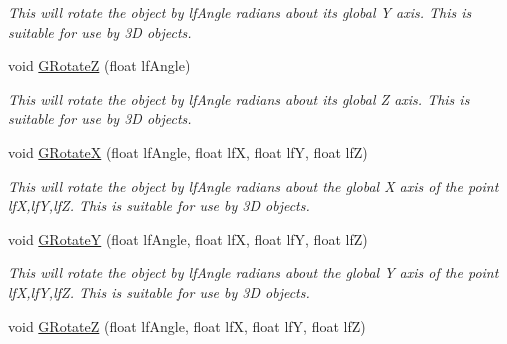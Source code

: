 \begin{DoxyCompactItemize}
\begin{DoxyCompactList}\small\item\em This will rotate the object by lfAngle radians about its global Y axis. This is suitable for use by 3D objects. \end{DoxyCompactList}\item 
\hypertarget{classc_camera_matrix4_a993d7410719b1fd7d871f728527a3947}{
void \hyperlink{classc_camera_matrix4_a993d7410719b1fd7d871f728527a3947}{GRotateZ} (float lfAngle)}
\label{classc_camera_matrix4_a993d7410719b1fd7d871f728527a3947}

\begin{DoxyCompactList}\small\item\em This will rotate the object by lfAngle radians about its global Z axis. This is suitable for use by 3D objects. \end{DoxyCompactList}\item 
\hypertarget{classc_camera_matrix4_a2fc16f6a7aa3ffec1317f71645aa857b}{
void \hyperlink{classc_camera_matrix4_a2fc16f6a7aa3ffec1317f71645aa857b}{GRotateX} (float lfAngle, float lfX, float lfY, float lfZ)}
\label{classc_camera_matrix4_a2fc16f6a7aa3ffec1317f71645aa857b}

\begin{DoxyCompactList}\small\item\em This will rotate the object by lfAngle radians about the global X axis of the point lfX,lfY,lfZ. This is suitable for use by 3D objects. \end{DoxyCompactList}\item 
\hypertarget{classc_camera_matrix4_a775326e51bf492340e8768d219a4e5e2}{
void \hyperlink{classc_camera_matrix4_a775326e51bf492340e8768d219a4e5e2}{GRotateY} (float lfAngle, float lfX, float lfY, float lfZ)}
\label{classc_camera_matrix4_a775326e51bf492340e8768d219a4e5e2}

\begin{DoxyCompactList}\small\item\em This will rotate the object by lfAngle radians about the global Y axis of the point lfX,lfY,lfZ. This is suitable for use by 3D objects. \end{DoxyCompactList}\item 
\hypertarget{classc_camera_matrix4_a8c99ce20f8594e9a66e0a7b2830ec9e9}{
void \hyperlink{classc_camera_matrix4_a8c99ce20f8594e9a66e0a7b2830ec9e9}{GRotateZ} (float lfAngle, float lfX, float lfY, float lfZ)}
\label{classc_camera_matrix4_a8c99ce20f8594e9a66e0a7b2830ec9e9}


\end{DoxyCompactItemize}
